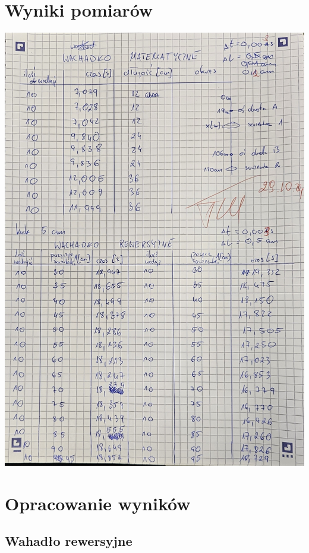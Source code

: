\documentclass[a4paper, 11pt]{article}
\begin{document}

\section{Wyniki pomiarów}\label{sec:wyniki_pomiarow} %

\begin{center}
	\includegraphics[scale=0.25]{images/pomiary.jpg}
\end{center}

\pagebreak
\section{Opracowanie wyników}\label{sec:opracowanie_wynikow} %

\subsection{Wahadło rewersyjne}
\end{document}
